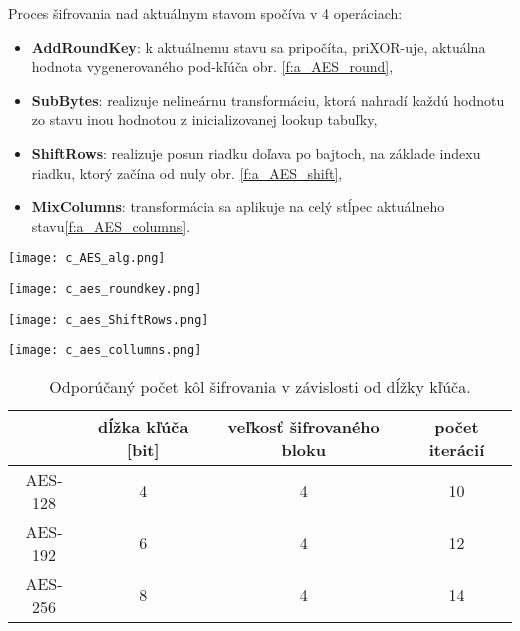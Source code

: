 \documentclass[12pt,a4paper,oneside,openright]{report}
\begin{document}
Proces šifrovania nad aktuálnym stavom spočíva v 4 operáciach:

\begin{itemize}
	\item \textbf{AddRoundKey}: k aktuálnemu stavu sa pripočíta, priXOR-uje, aktuálna hodnota vygenerovaného pod-kľúča  obr. \ref{f:a_AES_round},
	\item \textbf{SubBytes}: realizuje nelineárnu transformáciu, ktorá nahradí každú hodnotu zo stavu inou hodnotou z inicializovanej lookup tabuľky,
	\item \textbf{ShiftRows}: realizuje posun riadku doľava po bajtoch, na základe indexu riadku, ktorý začína od nuly obr. \ref{f:a_AES_shift},
	\item \textbf{MixColumns}: transformácia sa aplikuje na celý stĺpec aktuálneho stavu\ref{f:a_AES_columns}.
\end{itemize}


\begin{figure*}[!htb]
	\centering
	\texttt{[image: c\_AES\_alg.png]}
	\caption{Algoritmus štandardu AES \cite{AESAnimation}.}
	\label{f:a_AES_animation}
\end{figure*}

\begin{figure*}[!htb]
	\centering
	\texttt{[image: c\_aes\_roundkey.png]}
	\caption{AddRoundKey \cite{AES}.}
	\label{f:a_AES_round}
\end{figure*}

\begin{figure*}[!htb]
	\centering
	\texttt{[image: c\_aes\_ShiftRows.png]}
	\caption{Operácia shift rows\cite{AES}.}
	\label{f:a_AES_shift}
\end{figure*}

\begin{figure*}[!htb]
	\centering
	\texttt{[image: c\_aes\_collumns.png]}
	\caption{MixColumns \cite{AES}.}
	\label{f:a_AES_columns}
\end{figure*}

\begin{table}
	\centering
	\caption{Odporúčaný počet kôl šifrovania v závislosti od dĺžky kľúča\cite{AES}.} 
	\label{table:AES_pocet_iteracii}
	\begin{tabular}{|c|c|c|c|}
		\hline
		 & \textbf{dĺžka kľúča} [bit] & \textbf{veľkosť šifrovaného bloku} & \textbf{počet iterácií} \\
		\hline
		AES-128 & 4 & 4 & 10\\
		\hline
		AES-192 & 6 & 4 & 12\\
		\hline
		AES-256 & 8 & 4 & 14\\
		\hline
	\end{tabular}
\end{table}
\end{document}
